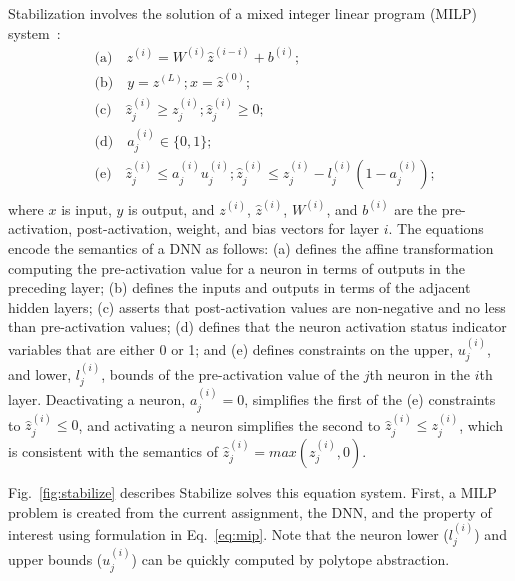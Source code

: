 \documentclass[oneside,11pt,dvipsnames]{book}
\numberwithin{equation}{section}
\theoremstyle{definition}
\theoremstyle{remark}
\newcommand{\functiontextformat}[1]{\textrm{\texttt{#1}}}
\newcommand{\tool}{\texttt{NeuralSAT}}
\begin{document}
Stabilization involves the solution of a mixed integer linear program (MILP) system~\cite{tjeng2019evaluating}:
\begin{equation}
    \begin{aligned}
        &\mbox{(a)}\quad z^{(i)} = W^{(i)} \hat{z}^{(i-i)} + b^{(i)}; \\
        &\mbox{(b)}\quad y = z^{(L)};  x = \hat{z}^{(0)}; \\
        &\mbox{(c)}\quad \hat{z}_j^{(i)} \ge {z}_j^{(i)}; \hat{z}_j^{(i)} \ge 0; \\
        &\mbox{(d)}\quad a_j^{(i)} \in \{ 0, 1\} ;\\
        &\mbox{(e)}\quad \hat{z}_j^{(i)} \le {a}_j^{(i)} {u}_j^{(i)}; \hat{z}_j^{(i)} \le {z}_j^{(i)} - {l}_j^{(i)}(1 - {a}_j^{(i)}); \\
    \end{aligned}
    \label{eq:mip}
\end{equation}
where $x$ is input, $y$ is output, and $z^{(i)}$, $\hat{z}^{(i)}$, $W^{(i)}$, and $b^{(i)}$ are the pre-activation, post-activation, weight, and bias vectors for layer $i$.
The equations encode the semantics of a DNN as follows:
(a) defines the affine transformation computing the pre-activation value for a neuron in terms of outputs in the preceding layer;
(b) defines the inputs and outputs in terms of the adjacent hidden layers;
(c) asserts that post-activation values are non-negative and no less than pre-activation values;
(d) defines that the neuron activation status indicator variables that are either 0 or 1; and
(e) defines constraints on the upper, $u_j^{(i)}$, and lower, $l_j^{(i)}$, bounds of the pre-activation value of the $j$th neuron in the $i$th layer.
Deactivating a neuron, $a_j^{(i)} = 0$, simplifies the first of the (e) constraints to $\hat{z}_j^{(i)} \le 0$, and activating a neuron simplifies the second to $\hat{z}_j^{(i)} \le z_j^{(i)}$, which is consistent with the semantics of $\hat{z}_j^{(i)} = max(z_j^{(i)},0)$.



Fig.~\ref{fig:stabilize} describes Stabilize solves this equation system.
First,  a MILP problem is created from the current assignment, the DNN, and the property of interest using formulation in Eq.~\ref{eq:mip}.
Note that the neuron lower (${l}_j^{(i)}$) and upper bounds (${u}_j^{(i)}$) can be quickly computed by polytope abstraction.
\end{document}
